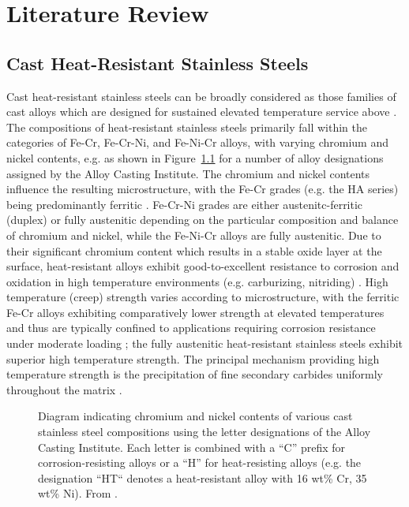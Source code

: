 \chapter{Literature Review} \label{ch:literature-review}

\section{Cast Heat-Resistant Stainless Steels}
Cast heat-resistant stainless steels can be broadly considered as those families of cast alloys which are designed for sustained elevated temperature service above  \cite{blair_cast_stainless_1990}.  The compositions of heat-resistant stainless steels primarily fall within the categories of Fe-Cr, Fe-Cr-Ni, and Fe-Ni-Cr alloys, with varying chromium and nickel contents, e.g. as shown in Figure~\ref{fig:aci-alloy-designations} for a number of alloy designations assigned by the Alloy Casting Institute. The chromium and nickel contents influence the resulting microstructure, with the Fe-Cr grades (e.g. the HA series) being predominantly ferritic \cite{davis_metallurgy_1994}. Fe-Cr-Ni grades are either austenitc-ferritic (duplex) or fully austenitic depending on the particular composition and balance of chromium and nickel, while the Fe-Ni-Cr alloys are fully austenitic. Due to their significant chromium content which results in a stable oxide layer at the surface, heat-resistant alloys exhibit good-to-excellent resistance to corrosion and oxidation in high temperature environments (e.g. carburizing, nitriding) \cite{davis_metallurgy_1994}. High temperature (creep) strength varies according to microstructure, with the ferritic Fe-Cr alloys exhibiting comparatively lower strength at elevated temperatures \cite{avery_cast_1969} and thus are typically confined to applications requiring corrosion resistance under moderate loading \cite{davis_metallurgy_1994}; the fully austenitic heat-resistant stainless steels exhibit superior high temperature strength. The principal mechanism providing high temperature strength is the precipitation of fine secondary carbides uniformly throughout the matrix \cite{avery_cast_1969,davis_metallurgy_1994}. 


\begin{figure}

\caption{Diagram indicating chromium and nickel contents of various cast stainless steel compositions using the letter designations of the Alloy Casting Institute. Each letter is combined with a “C” prefix for corrosion-resisting alloys or a “H” for heat-resisting alloys (e.g. the designation “HT“ denotes a heat-resistant alloy with 16 wt\% Cr, 35 wt\% Ni). From \citet{blair_cast_stainless_1990}.}
\label{fig:aci-alloy-designations}
\end{figure}

